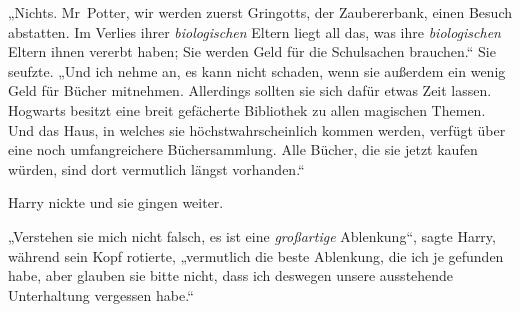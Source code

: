 „Nichts. Mr~Potter, wir werden zuerst Gringotts, der Zaubererbank, einen Besuch abstatten. Im Verlies ihrer \emph{biologischen} Eltern liegt all das, was ihre \emph{biologischen} Eltern ihnen vererbt haben; Sie werden Geld für die Schulsachen brauchen.“ Sie seufzte.
„Und ich nehme an, es kann nicht schaden, wenn sie außerdem ein wenig Geld für Bücher mitnehmen. Allerdings sollten sie sich dafür etwas Zeit lassen. Hogwarts besitzt eine breit gefächerte Bibliothek zu allen magischen Themen. Und das Haus, in welches sie höchstwahrscheinlich kommen werden, verfügt über eine noch umfangreichere Büchersammlung. Alle Bücher, die sie jetzt kaufen würden, sind dort vermutlich längst vorhanden.“

Harry nickte und sie gingen weiter.

„Verstehen sie mich nicht falsch, es ist eine \emph{großartige} Ablenkung“, sagte Harry, während sein Kopf rotierte, „vermutlich die beste Ablenkung, die ich je gefunden habe, aber glauben sie bitte nicht, dass ich deswegen unsere ausstehende Unterhaltung vergessen habe.“


